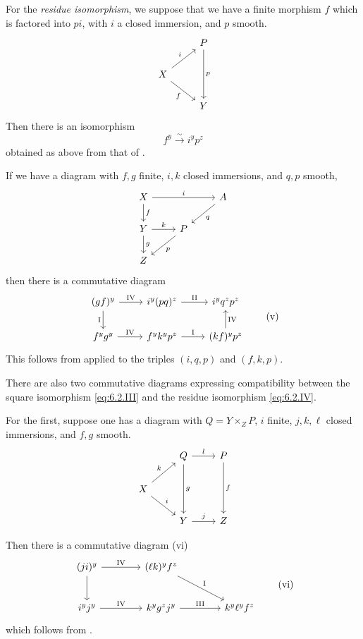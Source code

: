 For the \emph{residue isomorphism}, we suppose that we have a finite morphism $f$ which is factored into $pi$, with $i$ a closed immersion, and $p$ smooth.
\[
\begin{tikzcd}
	& P \arrow[dd, "p"] \\
	X \arrow[ur, "i"] \arrow[dr, "f"'] & \\
	& Y
\end{tikzcd}
\]
Then there is an isomorphism
\[
f^{y} \xrightarrow{\sim} i^{y}p^{z} \tag{IV}\label{eq:6.2.IV}
\]
obtained as above from that of .

If we have a diagram with $f,g$ finite, $i,k$ closed immersions, and $q,p$ smooth,
\[
\begin{tikzcd}
X\arrow[rr, "i"] \arrow[d, "f"]&&A\arrow[dl, "q"]\\
Y\arrow[r, "k"] \arrow[d, "g"]&P\arrow[dl, "p"]\\
Z
\end{tikzcd}
\]
then there is a commutative diagram
\[
\begin{tikzcd}
(gf)^{y} \ar[r,"\mathrm{IV}"] \ar[d,"\mathrm{I}"'] & i^{y}(pq)^{z} \ar[r,"\mathrm{II}"] & i^{y}q^{z}p^{z} \\
f^{y}g^{y} \ar[r,"\mathrm{IV}"] & f^{y}k^{y}p^{z} \ar[r,"\mathrm{I}"] & (kf)^{y}p^{z} \ar[u,"\mathrm{IV}"']
\end{tikzcd}
\tag{v}\label{eq:6.2.v}
\]
This follows from  applied to the triples $(i,q,p)$ and $(f,k,p)$.

There are also two commutative diagrams expressing compatibility between the square isomorphism \eqref{eq:6.2.III} and the residue isomorphism \eqref{eq:6.2.IV}.

For the first, suppose one has a diagram with $Q = Y\times_{Z} P$, $i$ finite, $j,k,\ell$ closed immersions, and $f,g$ smooth.
\[
\begin{tikzcd}
& Q\arrow[dd, "g"]\arrow[r, "l"]&P\arrow[dd, "f"]\\
X\arrow[ru, "k"]\arrow[rd, "i"]\\
&Y\arrow[r, "j"]&Z
\end{tikzcd}
\]


Then there is a commutative diagram (vi)
\[
\begin{tikzcd}[row sep=2.5em, column sep=4em]
	(ji)^y
	\arrow[r, "\text{IV}"]
	\arrow[d]
	& (\ell k)^y f^z
	\arrow[dr, "\text{I}"] \\
	i^y j^y
	\arrow[r, "\text{IV}"]
	& k^y g^z j^y
	\arrow[r, "\text{III}"]
	& k^y \ell^y f^z
\end{tikzcd}
\tag{vi}\label{eq:6.2.vi}
\]
which follows from .

